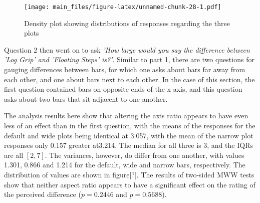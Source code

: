 \documentclass[
]{article}
\newenvironment{Shaded}{\begin{snugshade}}{\end{snugshade}}
\newcommand{\DecValTok}[1]{\textcolor[rgb]{0.00,0.00,0.81}{#1}}
\newcommand{\KeywordTok}[1]{\textcolor[rgb]{0.13,0.29,0.53}{\textbf{#1}}}
\newcommand{\NormalTok}[1]{#1}
\newcommand{\OperatorTok}[1]{\textcolor[rgb]{0.81,0.36,0.00}{\textbf{#1}}}
\newcommand{\StringTok}[1]{\textcolor[rgb]{0.31,0.60,0.02}{#1}}
\begin{document}
\begin{figure}
\centering
\texttt{[image: main\_files/figure-latex/unnamed-chunk-28-1.pdf]}
\caption{Density plot showing distributions of responses regarding the
three plots}
\end{figure}

Question 2 then went on to ask
\textit{'How large would you say the difference between 'Log Grip' and 'Floating Steps' is?'}.
Similar to part 1, there are two questions for gauging differences
between bars, for which one asks about bars far away from each other,
and one about bars next to each other. In the case of this section, the
first question contained bars on opposite ends of the x-axis, and this
question asks about two bars that sit adjacent to one another.

\begin{Shaded}
\end{Shaded}

The analysis results here show that altering the axis ratio appears to
have even less of an effect than in the first question, with the means
of the responses for the default and wide plots being identical at
3.057, with the mean of the narrow plot responses only 0.157 greater
at3.214. The median for all three is 3, and the IQRs are all \([2, 7]\).
The variances, however, do differ from one another, with values 1.301,
0.866 and 1.214 for the default, wide and narrow bars, respectively. The
distribution of values are shown in figure{[}?{]}. The results of
two-sided MWW tests show that neither aspect ratio appears to have a
significant effect on the rating of the perceived difference
(\(p=0.2446\) and \(p=0.5688\)).
\end{document}
